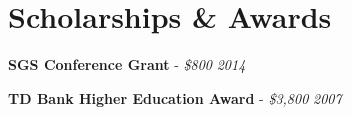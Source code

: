 \section{\sc Scholarships \& Awards}

\textbf{SGS Conference Grant} - {\em \$800} \hfill {\em 2014}

\textbf{TD Bank Higher Education Award} - {\em \$3,800} \hfill {\em 2007}